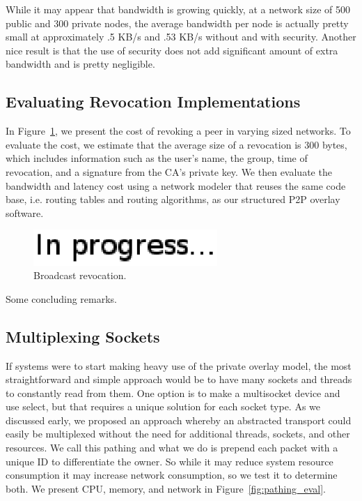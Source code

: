 \documentclass[conference]{IEEEtran}
\begin{document}
While it may appear that bandwidth is growing quickly, at a network size of
500 public and 300 private nodes, the average bandwidth per node is actually
pretty small at approximately .5 KB/s and .53 KB/s without and with security.
Another nice result is that the use of security does not add significant
amount of extra bandwidth and is pretty negligible.

\subsection{Evaluating Revocation Implementations}
\label{evaluation_revocation}
In Figure~\ref{fig:broadcast_revocation}, we present the cost of revoking a
peer in varying sized networks.  To evaluate the cost, we estimate that the
average size of a revocation is 300 bytes, which includes information such
as the user's name, the group, time of revocation, and a signature from the
CA's private key.  We then evaluate the bandwidth and latency cost using a
network modeler that reuses the same code base, i.e. routing tables and routing
algorithms, as our structured P2P overlay software.  

\begin{figure}[h]
\centering
\includegraphics[width=2.75in]{in_progress.eps}
\caption{Broadcast revocation.}
\label{fig:broadcast_revocation}
\end{figure}

Some concluding remarks.

\subsection{Multiplexing Sockets}
If systems were to start making heavy use of the private overlay model, the most
straightforward and simple approach would be to have many sockets and threads to
constantly read from them.  One option is to make a multisocket device and use
select, but that requires a unique solution for each socket type.  As we
discussed early, we proposed an approach whereby an abstracted transport could
easily be multiplexed without the need for additional threads, sockets, and other
resources.  We call this pathing and what we do is prepend each packet with a
unique ID to differentiate the owner.  So while it may reduce system resource
consumption it may increase network consumption, so we test it to determine both.
We present CPU, memory, and network in Figure~\ref{fig:pathing_eval}.
\end{document}
